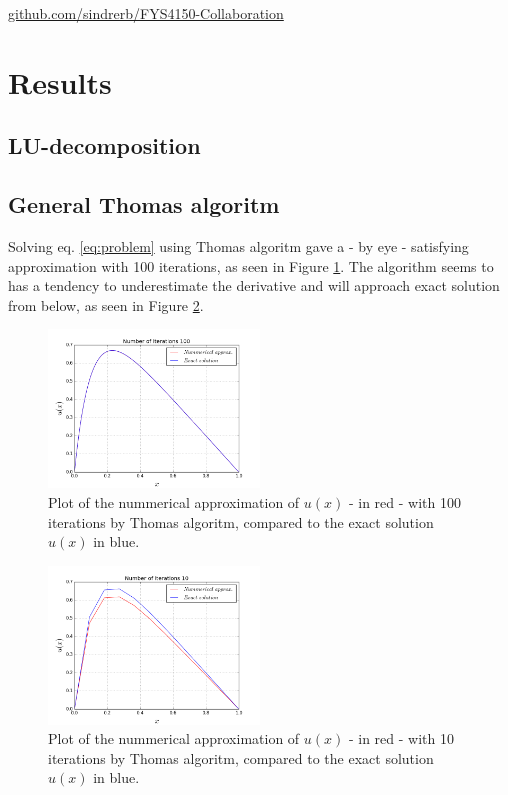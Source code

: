 \documentclass[twoside,twocolumn]{article}
\begin{document}
\begin{center}
 \href{https://github.com/sindrerb/FYS4150-Collaboration}{github.com/sindrerb/FYS4150-Collaboration}
\end{center}

\section{Results}
\subsection{LU-decomposition}

\subsection{General Thomas algoritm}
Solving eq. \ref{eq:problem} using Thomas algoritm gave a - by eye - satisfying approximation with 100 iterations, as seen in Figure \ref{fig:Thomas1E2}. The algorithm seems to has a tendency to underestimate the derivative and will approach exact solution from below, as seen in Figure \ref{fig:Thomas10}.

\begin{figure}[htp]
\includegraphics[width=0.5\textwidth]{../figures/b-run1e2.png} 
\caption{Plot of the nummerical approximation of $u(x)$ - in red - with 100 iterations by Thomas algoritm, compared to the exact solution $u(x)$ in blue.} \label{fig:Thomas1E2}
\end{figure}

\begin{figure}[htp]
\includegraphics[width=0.5\textwidth]{../figures/b-run10.png} 
\caption{Plot of the nummerical approximation of $u(x)$ - in red - with 10 iterations by Thomas algoritm, compared to the exact solution $u(x)$ in blue.} \label{fig:Thomas10}
\end{figure}
\end{document}

